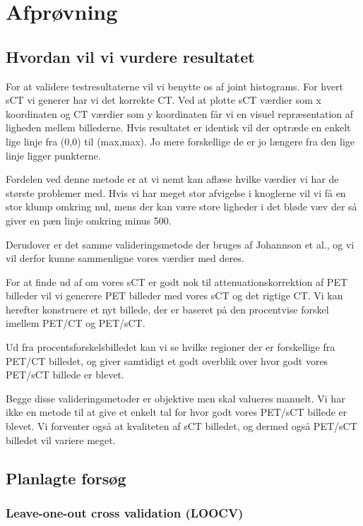 \section{Afprøvning}

\subsection{Hvordan vil vi vurdere resultatet}

For at validere testresultaterne vil vi benytte os af joint histograms. For hvert sCT vi generer har vi det korrekte CT. Ved at plotte sCT værdier som x koordinaten og CT værdier som y koordinaten får vi en visuel repræsentation af ligheden mellem billederne. Hvis resultatet er identisk vil der optræde en enkelt lige linje fra (0,0) til (max,max). Jo mere forskellige de er jo længere fra den lige linje ligger punkterne.

Fordelen ved denne metode er at vi nemt kan aflæse hvilke værdier vi har de største problemer med. Hvis vi har meget stor afvigelse i knoglerne vil vi få en stor klump omkring nul, mens der kan være store ligheder i det bløde væv der så giver en pæn linje omkring minus 500.

Derudover er det samme valideringsmetode der bruges af Johannson et al., og vi vil derfor kunne sammenligne vores værdier med deres.

For at finde ud af om vores sCT er godt nok til attenuationskorrektion af PET billeder vil vi generere PET billeder med vores sCT og det rigtige CT. Vi kan herefter konstruere et nyt billede, der er baseret på den procentvise forskel imellem PET/CT og PET/sCT. 

Ud fra procentsforskelsbilledet kan vi se hvilke regioner der er forskellige fra PET/CT billedet, og giver samtidigt et godt overblik over hvor godt vores PET/sCT billede er blevet.

Begge disse valideringsmetoder er objektive men skal valueres manuelt. Vi har ikke en metode til at give et enkelt tal for hvor godt vores PET/sCT billede er blevet. Vi forventer også at kvaliteten af sCT billedet, og dermed også PET/sCT billedet vil variere meget.


\subsection{Planlagte forsøg}

\subsubsection{Leave-one-out cross validation (LOOCV)}
